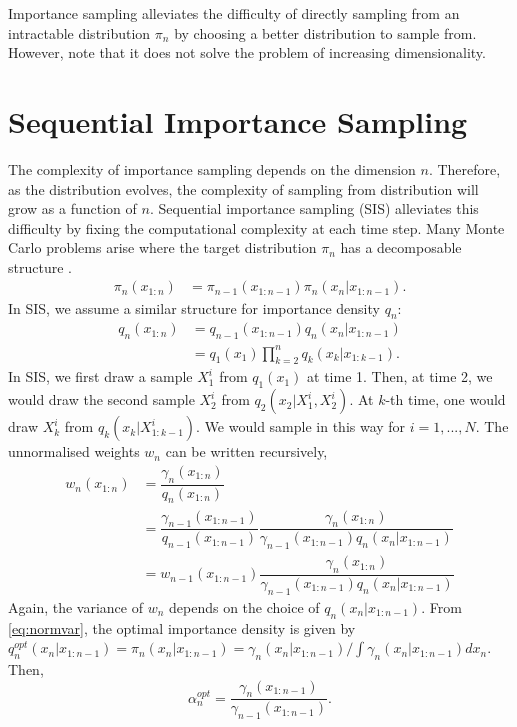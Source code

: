 \documentclass[10pt]{article}
\theoremstyle{definition}
\numberwithin{equation}{section}
\begin{document}
Importance sampling alleviates the difficulty of directly sampling from an intractable distribution $\pi_n$ by choosing a better distribution to sample from. However, note that it does not solve the problem of increasing dimensionality.
\section{Sequential Importance Sampling}

The complexity of importance sampling depends on the dimension $n$. Therefore, as the distribution evolves, the complexity of sampling from distribution will grow as a function of $n$. Sequential importance sampling (SIS) alleviates this difficulty by fixing the computational complexity at each time step. 
Many Monte Carlo problems arise where the target distribution $\pi_n$ has a decomposable structure \cite{SMCinPrac}.
\begin{align}
\pi_n(x_{1:n}) &= \pi_{n-1}(x_{1:n-1})\pi_n(x_n | x_{1:n-1}).
\end{align}
In SIS, we assume a similar structure for importance density $q_n$:
\begin{align}
	q_n(x_{1:n}) &= q_{n-1}(x_{1:n-1})q_n(x_n | x_{1:n-1}) \\
	&= q_1(x_1)\prod_{k=2}^{n}q_k(x_k|x_{1:k-1}).
\end{align} 
In SIS, we first draw a sample $X^i_1$ from $q_1(x_1)$ at time 1. Then, at time 2, we would draw the second sample $X^i_2$ from $q_2(x_2|X^i_1, X^i_2)$. At $k$-th time, one would draw $X^i_k$ from $q_k(x_k | X^i_{1:k-1})$. We would sample in this way for $i = 1, ...,N$. The unnormalised weights $w_n$ can be written recursively, 
\begin{align}
	w_n(x_{1:n}) &= \dfrac{\gamma_n(x_{1:n})}{q_n(x_{1:n})} \\
	&=\dfrac{\gamma_{n-1}(x_{1:n-1})}{q_{n-1}(x_{1:n-1})}\dfrac{\gamma_n(x_{1:n})}{\gamma_{n-1}(x_{1:n-1})q_n(x_n|x_{1:n-1})}\\
	&= w_{n-1}(x_{1:n-1})\dfrac{\gamma_n(x_{1:n})}{\gamma_{n-1}(x_{1:n-1})q_n(x_n|x_{1:n-1})}
\end{align}
Again, the variance of $w_n$ depends on the choice of $q_n(x_n|x_{1:n-1})$. From \eqref{eq:normvar}, the optimal importance density is given by $q_n^{opt}(x_n|x_{1:n-1}) = \pi_n(x_n|x_{1:n-1}) = \gamma_n(x_n | x_{1:n-1})/\int\gamma_n(x_n | x_{1:n-1})dx_n $. Then, 
\begin{equation}
	\alpha_n^{opt} = \dfrac{\gamma_n(x_{1:n-1})}{\gamma_{n-1}(x_{1:n-1})}.
\end{equation}
\end{document}

